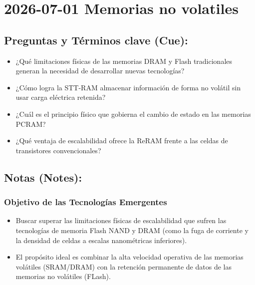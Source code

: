 \documentclass{article}
\begin{document}
\section{2026-07-01 Memorias no volatiles}
\label{sec:org2cc9762}

\subsection{Preguntas y Términos clave (Cue):}
\label{sec:orgb567925}
\begin{itemize}
\item ¿Qué limitaciones físicas de las memorias DRAM y Flash tradicionales
generan la necesidad de desarrollar nuevas tecnologías?
\item ¿Cómo logra la STT-RAM almacenar información de forma no volátil sin
usar carga eléctrica retenida?
\item ¿Cuál es el principio físico que gobierna el cambio de estado en las
memorias PCRAM?
\item ¿Qué ventaja de escalabilidad ofrece la ReRAM frente a las celdas de
transistores convencionales?
\end{itemize}

\subsection{Notas (Notes):}
\label{sec:org7b373e3}
\subsubsection{Objetivo de las Tecnologías Emergentes}
\label{sec:org254b09b}
\begin{itemize}
\item Buscar superar las limitaciones físicas de escalabilidad que sufren
las tecnologías de memoria Flash NAND y DRAM (como la fuga de
corriente y la densidad de celdas a escalas nanométricas inferiores).
\item El propósito ideal es combinar la alta velocidad operativa de las
memorias volátiles (SRAM/DRAM) con la retención permanente de datos
de las memorias no volátiles (FLash).
\end{itemize}
\end{document}
